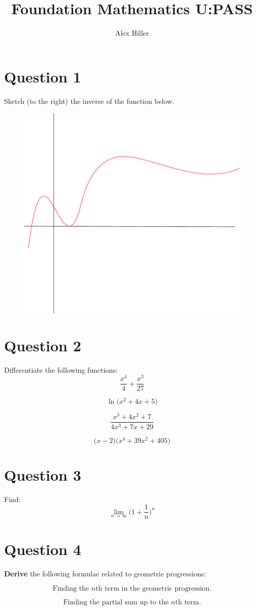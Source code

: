 \documentclass{article}
\author{Alex Hiller}
\title{Foundation Mathematics U:PASS}
\begin{document}
\maketitle

\section{Question 1}
Sketch (to the right) the inverse of the function below.
\begin{figure}[h!]

  \includegraphics[width=0.4\linewidth]{function.pdf}
\end{figure}

\section{Question 2}
Differentiate the following functions:
\begin{equation}
  \frac{x^{4}_{} }{4} + \frac{x^{3}_{} }{27}
\end{equation}

\begin{equation}
  \ln \big( x^{2} + 4 x + 5 \big)
\end{equation}

\begin{equation}
  \frac{x^3 + 4x^2 + 7}{4x^3 + 7x + 29}
\end{equation}

\begin{equation}
  \big( x - 2 \big) \big( x^4 + 39x^2 + 405 \big)
\end{equation}

\section{Question 3} 
Find:
\begin{equation}
  \lim_{n \rightarrow \infty} \bigg( 1 + \frac{1}{n}  \bigg)^n
\end{equation}

\section{Question 4}

\textbf{Derive} the following formulae related to geometric progressions:

\begin{equation}
  \text{Finding the $n$th term in the geometric progression.}
\end{equation}

\begin{equation}
  \text{Finding the partial sum up to the $n$th term.}
\end{equation}
\end{document}
